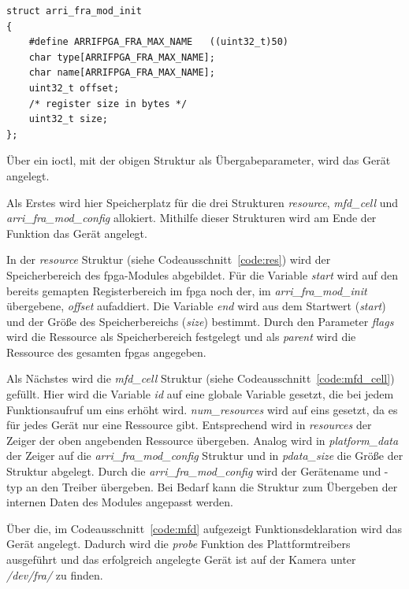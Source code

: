 \begin{lstfloat}
\begin{lstlisting}
struct arri_fra_mod_init 
{
	#define ARRIFPGA_FRA_MAX_NAME   ((uint32_t)50)
	char type[ARRIFPGA_FRA_MAX_NAME];
	char name[ARRIFPGA_FRA_MAX_NAME];
	uint32_t offset;
	/* register size in bytes */
	uint32_t size;
};
\end{lstlisting}
\end{lstfloat}

Über ein \ac{ioctl}, mit der obigen Struktur als Übergabeparameter, wird das Gerät angelegt. 


Als Erstes wird hier Speicherplatz für die drei Strukturen \textit{resource}, \textit{mfd\_cell} und \textit{arri\_fra\_mod\_config} allokiert. Mithilfe dieser Strukturen wird am Ende der Funktion das Gerät angelegt.


In der \textit{resource} Struktur (siehe Codeausschnitt~\ref{code:res}) wird der Speicherbereich des \ac{fpga}-Modules abgebildet. Für die Variable \textit{start} wird auf den bereits gemapten Registerbereich im \ac{fpga} noch der, im \textit{arri\_fra\_mod\_init} übergebene, \textit{offset} aufaddiert. Die Variable \textit{end} wird aus dem Startwert (\textit{start}) und der Größe des Speicherbereichs (\textit{size}) bestimmt. Durch den Parameter \textit{flags} wird die Ressource als Speicherbereich festgelegt und als \textit{parent} wird die Ressource des gesamten \ac{fpga}s angegeben.


Als Nächstes wird die \textit{mfd\_cell} Struktur (siehe Codeausschnitt~\ref{code:mfd_cell}) gefüllt. Hier wird die Variable \textit{id} auf eine globale Variable gesetzt, die bei jedem Funktionsaufruf um eins erhöht wird. \textit{num\_resources} wird auf eins gesetzt, da es für jedes Gerät nur eine Ressource gibt. Entsprechend wird in  \textit{resources} der Zeiger der oben angebenden Ressource übergeben. Analog wird in \textit{platform\_data} der Zeiger auf die \textit{arri\_fra\_mod\_config} Struktur und in \textit{pdata\_size} die Größe der Struktur abgelegt.
Durch die \textit{arri\_fra\_mod\_config} wird der Gerätename und -typ an den Treiber übergeben. Bei Bedarf kann die Struktur zum Übergeben der internen Daten des Modules angepasst werden.

Über die, im Codeausschnitt~\ref{code:mfd} aufgezeigt Funktionsdeklaration wird das Gerät angelegt. Dadurch wird die \textit{probe} Funktion des Plattformtreibers ausgeführt und das erfolgreich angelegte Gerät ist auf der Kamera unter \textit{/dev/fra/} zu finden.



